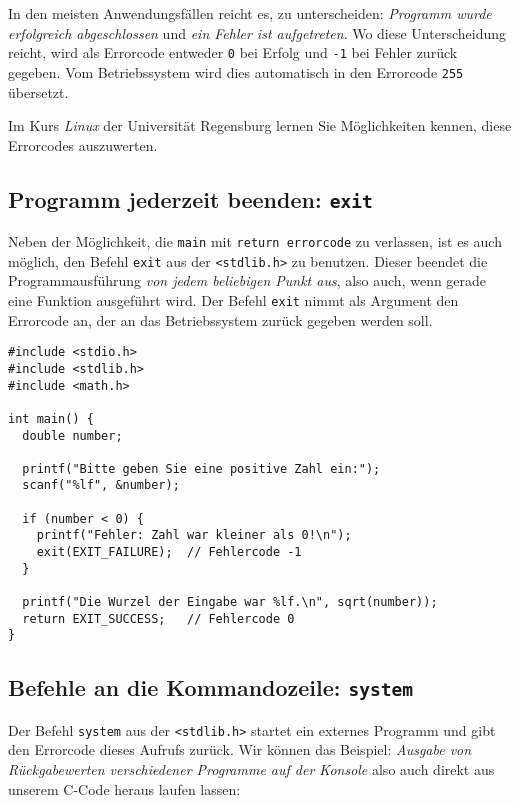 \begin{hintbox}
In den meisten Anwendungsfällen reicht es, zu unterscheiden: \emph{Programm wurde erfolgreich abgeschlossen} und \emph{ein Fehler ist aufgetreten}. Wo diese Unterscheidung reicht, wird als Errorcode entweder \texttt{0} bei Erfolg und \texttt{-1} bei Fehler zurück gegeben. Vom Betriebssystem wird dies automatisch in den Errorcode \texttt{255} übersetzt.
\end{hintbox}

Im Kurs \emph{Linux} der Universität Regensburg lernen Sie Möglichkeiten kennen, diese Errorcodes auszuwerten.

\subsection{Programm jederzeit beenden: \texttt{exit}}
Neben der Möglichkeit, die \texttt{main} mit \texttt{return errorcode} zu verlassen, ist es auch möglich, den Befehl \texttt{exit} aus der \texttt{<stdlib.h>} zu benutzen. Dieser beendet die Programmausführung \emph{von jedem beliebigen Punkt aus}, also auch, wenn gerade eine Funktion ausgeführt wird. Der Befehl \texttt{exit} nimmt als Argument den Errorcode an, der an das Betriebssystem zurück gegeben werden soll.

\begin{codebox}
\begin{verbatim}
#include <stdio.h>
#include <stdlib.h>
#include <math.h>
 
int main() {
  double number;
  
  printf("Bitte geben Sie eine positive Zahl ein:");
  scanf("%lf", &number);
  
  if (number < 0) {
    printf("Fehler: Zahl war kleiner als 0!\n");
    exit(EXIT_FAILURE);  // Fehlercode -1
  }
 
  printf("Die Wurzel der Eingabe war %lf.\n", sqrt(number));
  return EXIT_SUCCESS;   // Fehlercode 0
}
\end{verbatim}
\end{codebox}

\subsection{Befehle an die Kommandozeile: \texttt{system}}
Der Befehl \texttt{system} aus der \texttt{<stdlib.h>} startet ein externes Programm und gibt den Errorcode dieses Aufrufs zurück. Wir können das Beispiel: \emph{Ausgabe von Rückgabewerten verschiedener Programme auf der Konsole} also auch direkt aus unserem C-Code heraus laufen lassen:

